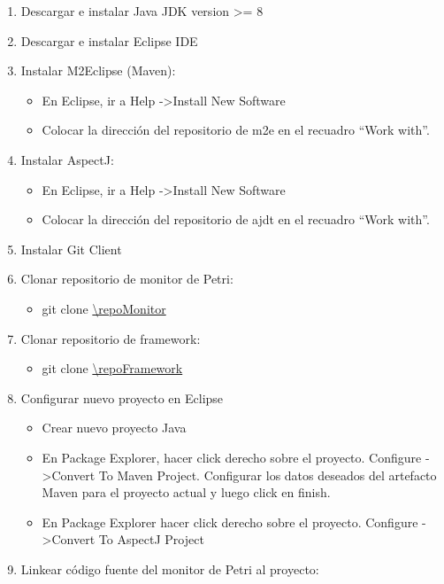 \begin{enumerate}
    \item Descargar e instalar Java JDK version \textgreater= 8
    \item Descargar e instalar Eclipse IDE 
    \item Instalar M2Eclipse (Maven):
        \begin{itemize}
            \item En Eclipse, ir a Help -\textgreater Install New Software
        \item Colocar la dirección del repositorio de m2e en el recuadro “Work
              with”.
        \end{itemize}
    \item Instalar AspectJ:
        \begin{itemize}
            \item En Eclipse, ir a Help -\textgreater Install New Software
            \item Colocar la dirección del repositorio de ajdt en el recuadro
            “Work with”.
        \end{itemize}
   \item Instalar Git Client
   \item Clonar repositorio de monitor de Petri:
        \begin{itemize}
          \item git clone \url{\repoMonitor}
        \end{itemize}
   \item Clonar repositorio de \nombreFramework framework:
        \begin{itemize}
          \item git clone \url{\repoFramework}
        \end{itemize}
   \item Configurar nuevo proyecto en Eclipse
        \begin{itemize}
          \item Crear nuevo proyecto Java
          \item En Package Explorer, hacer click derecho sobre el proyecto.
          Configure -\textgreater  Convert To Maven Project. Configurar los
          datos deseados del artefacto Maven para el proyecto actual y luego click en finish.
          \item En Package Explorer hacer click derecho sobre el proyecto.
          Configure -\textgreater  Convert To AspectJ Project
        \end{itemize}
   \item Linkear código fuente del monitor de Petri al proyecto:

\end{enumerate}
